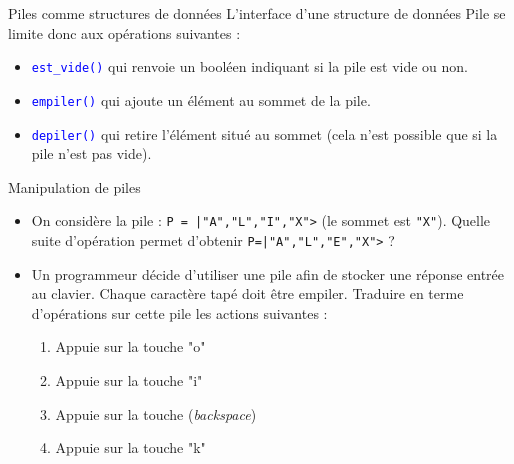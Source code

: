 \documentclass[10pt]{beamer}
\begin{document}
\begin{frame}{\SL}
	\mframe{\SL}
	\begin{alertblock}{Piles comme structures de données}
		L'interface d'une structure de données Pile se limite donc aux opérations suivantes :
		\begin{itemize}
			\item<2-> \textcolor{blue}{\tt est\_vide()} qui renvoie un booléen indiquant si la pile est vide ou non.
			\item<3-> \textcolor{blue}{\tt empiler()} qui ajoute un élément au sommet de la pile.
			\item<4-> \textcolor{blue}{\tt depiler()} qui retire l'élément situé au sommet (cela n'est possible que si la pile n'est pas vide).
		\end{itemize}
	\end{alertblock}
\end{frame}

\begin{frame}{\SL}
	\mframe{\SL}
	\begin{exampleblock}{Manipulation de piles}
		\begin{itemize}
			\item<2-> On considère la pile : {\tt P = |"A","L","I","X">} (le sommet est {\tt "X"}). Quelle suite d'opération permet d'obtenir {\tt P=|"A","L","E","X">} ?
			\item<3-> Un programmeur décide d'utiliser une pile afin de stocker une réponse entrée au clavier. Chaque caractère tapé doit être empiler. Traduire en terme d'opérations sur cette pile les actions suivantes :
			      \begin{enumerate}
				      \item<4-> Appuie sur la touche "o"
				      \item<5-> Appuie sur la touche "i"
				      \item<6-> Appuie sur la touche \framebox{$\longleftarrow$} (\textit{backspace})
				      \item<7-> Appuie sur la touche "k"
			      \end{enumerate}
		\end{itemize}
	\end{exampleblock}
\end{frame}
\end{document}
